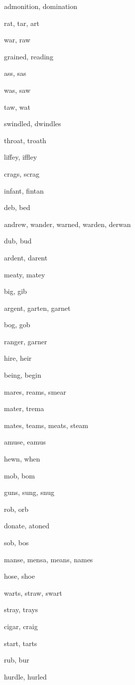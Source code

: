     \item admonition, domination
    \item rat, tar, art
    \item war, raw
    \item grained, reading
    \item ass, sas
    \item was, saw
    \item taw, wat
    \item swindled, dwindles
    \item throat, troath
    \item liffey, iffley
    \item crags, scrag
    \item infant, fintan
    \item deb, bed
    \item andrew, wander, warned, warden, derwan
    \item dub, bud
    \item ardent, darent
    \item meaty, matey
    \item big, gib
    \item argent, garten, garnet
    \item bog, gob
    \item ranger, garner
    \item hire, heir
    \item being, begin
    \item mares, reams, smear
    \item mater, trema
    \item mates, teams, meats, steam
    \item amuse, eamus
    \item hewn, when
    \item mob, bom
    \item guns, sung, snug
    \item rob, orb
    \item donate, atoned
    \item sob, bos
    \item manse, mensa, means, names
    \item hose, shoe
    \item warts, straw, swart
    \item stray, trays
    \item cigar, craig
    \item start, tarts
    \item rub, bur
    \item hurdle, hurled
